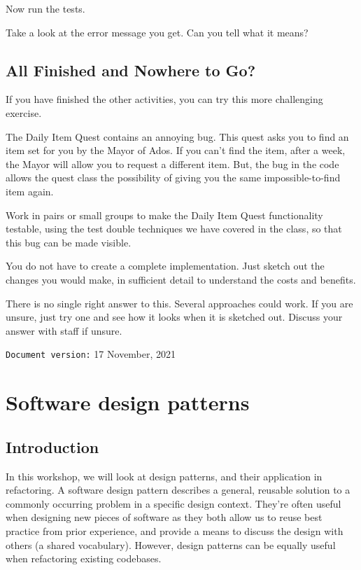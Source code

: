 \documentclass[
]{book}
\begin{document}
Now run the tests.

Take a look at the error message you get. Can you tell what it means?

\hypertarget{next}{%
\section{All Finished and Nowhere to Go?}\label{next}}

If you have finished the other activities, you can try this more challenging exercise.

The Daily Item Quest contains an annoying bug. This quest asks you to find an item set for you by the Mayor of Ados. If you can't find the item, after a week, the Mayor will allow you to request a different item. But, the bug in the code allows the quest class the possibility of giving you the same impossible-to-find item again.

Work in pairs or small groups to make the Daily Item Quest functionality testable, using the test double techniques we have covered in the class, so that this bug can be made visible.

You do not have to create a complete implementation. Just sketch out the changes you would make, in sufficient detail to understand the costs and benefits.

There is no single right answer to this. Several approaches could work. If you are unsure, just try one and see how it looks when it is sketched out. Discuss your answer with staff if unsure.

\texttt{Document\ version:} 17 November, 2021

\hypertarget{patterning}{%
\chapter{Software design patterns}\label{patterning}}

\hypertarget{introduction}{%
\section{Introduction}\label{introduction}}

In this workshop, we will look at design patterns, and their application in refactoring. A software design pattern describes a general, reusable solution to a commonly occurring problem in a specific design context. They're often useful when designing new pieces of software as they both allow us to reuse best practice from prior experience, and provide a means to discuss the design with others (a shared vocabulary). However, design patterns can be equally useful when refactoring existing codebases.
\end{document}
